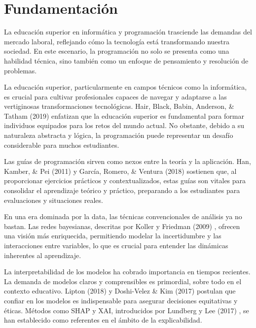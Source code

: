 \hypertarget{Fundamentación}{%
\section{Fundamentación}\label{Fundamentación}}

La educación superior en informática y programación trasciende las demandas del mercado laboral, reflejando cómo la tecnología está transformando nuestra sociedad. En este escenario, la programación no solo se presenta como una habilidad técnica, sino también como un enfoque de pensamiento y resolución de problemas.

La educación superior, particularmente en campos técnicos como la informática, es crucial para cultivar profesionales capaces de navegar y adaptarse a las vertiginosas transformaciones tecnológicas. Hair, Black, Babin, Anderson, \& Tatham (2019) \cite{hair2019advanced} enfatizan que la educación superior es fundamental para formar individuos equipados para los retos del mundo actual. No obstante, debido a su naturaleza abstracta y lógica, la programación puede representar un desafío considerable para muchos estudiantes.

Las guías de programación sirven como nexos entre la teoría y la aplicación. Han, Kamber, \& Pei (2011) \cite{han2011data} y García, Romero, \& Ventura (2018) \cite{garcia2018prediccion} sostienen que, al proporcionar ejercicios prácticos y contextualizados, estas guías son vitales para consolidar el aprendizaje teórico y práctico, preparando a los estudiantes para evaluaciones y situaciones reales.

En una era dominada por la data, las técnicas convencionales de análisis ya no bastan. Las redes bayesianas, descritas por Koller y Friedman (2009) \cite{koller2009introduction}, ofrecen una visión más enriquecida, permitiendo modelar la incertidumbre y las interacciones entre variables, lo que es crucial para entender las dinámicas inherentes al aprendizaje.

La interpretabilidad de los modelos ha cobrado importancia en tiempos recientes. La demanda de modelos claros y comprensibles es primordial, sobre todo en el contexto educativo. Lipton (2018) \cite{lipton2018mythos} y Doshi-Velez \& Kim (2017) \cite{doshivelez2017rigorous} postulan que confiar en los modelos es indispensable para asegurar decisiones equitativas y éticas. Métodos como SHAP y XAI, introducidos por Lundberg y Lee (2017) \cite{lundberg2017unified}, se han establecido como referentes en el ámbito de la explicabilidad.

